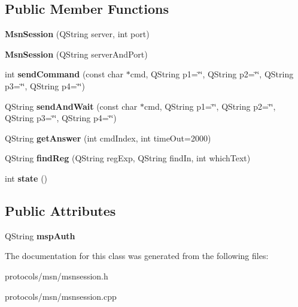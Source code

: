 \subsection*{Public Member Functions}
\begin{DoxyCompactItemize}
\item 
\hypertarget{classMsnSession_a30e08ba72966421aadad02e09d7df5f1}{
{\bfseries MsnSession} (QString server, int port)}
\label{classMsnSession_a30e08ba72966421aadad02e09d7df5f1}

\item 
\hypertarget{classMsnSession_ac0df2e2acb33aba75c8c4870812574bf}{
{\bfseries MsnSession} (QString serverAndPort)}
\label{classMsnSession_ac0df2e2acb33aba75c8c4870812574bf}

\item 
\hypertarget{classMsnSession_a1bdac5fcf73924a3c81d3e34ac5fe7b8}{
int {\bfseries sendCommand} (const char $\ast$cmd, QString p1=\char`\"{}\char`\"{}, QString p2=\char`\"{}\char`\"{}, QString p3=\char`\"{}\char`\"{}, QString p4=\char`\"{}\char`\"{})}
\label{classMsnSession_a1bdac5fcf73924a3c81d3e34ac5fe7b8}

\item 
\hypertarget{classMsnSession_aa6f156e3c5a7dbc76e735b1a6bceca97}{
QString {\bfseries sendAndWait} (const char $\ast$cmd, QString p1=\char`\"{}\char`\"{}, QString p2=\char`\"{}\char`\"{}, QString p3=\char`\"{}\char`\"{}, QString p4=\char`\"{}\char`\"{})}
\label{classMsnSession_aa6f156e3c5a7dbc76e735b1a6bceca97}

\item 
\hypertarget{classMsnSession_aa3562f72464aa050480b74bb7083a98b}{
QString {\bfseries getAnswer} (int cmdIndex, int timeOut=2000)}
\label{classMsnSession_aa3562f72464aa050480b74bb7083a98b}

\item 
\hypertarget{classMsnSession_a82a9d08f3a777c698c45d44130c03ebe}{
QString {\bfseries findReg} (QString regExp, QString findIn, int whichText)}
\label{classMsnSession_a82a9d08f3a777c698c45d44130c03ebe}

\item 
\hypertarget{classMsnSession_a7aa744964796a46be39f673ceb396871}{
int {\bfseries state} ()}
\label{classMsnSession_a7aa744964796a46be39f673ceb396871}

\end{DoxyCompactItemize}
\subsection*{Public Attributes}
\begin{DoxyCompactItemize}
\item 
\hypertarget{classMsnSession_a80b2bf50002a8852bd6526244e237a6c}{
QString {\bfseries mspAuth}}
\label{classMsnSession_a80b2bf50002a8852bd6526244e237a6c}

\end{DoxyCompactItemize}


The documentation for this class was generated from the following files:\begin{DoxyCompactItemize}
\item 
protocols/msn/msnsession.h\item 
protocols/msn/msnsession.cpp\end{DoxyCompactItemize}
